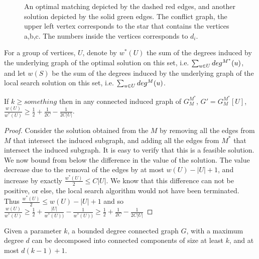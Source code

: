 \begin{figure}[h]
\centering
\subfloat[]{
\label{subfloat:graph}

}
\subfloat[]{
\label{subfloat:conflict}

}
\caption[]{
\label{fig:conflict}
An optimal matching depicted by the dashed red edges,
and another solution depicted by the solid green edges.  
The conflict graph, the upper left vertex corresponds 
to the star that contains the vertices a,b,c.
The numbers inside the vertices corresponds to $d_i$.   
}
\end{figure}  

For a group of vertices, $U$, denote by $w^*(U)$ the sum of the degrees 
induced by the underlying graph of the optimal solution on this set, i.e.
$\sum_{u \in U} \dinout[M^*](u)$, 
and let $w(S)$ be the sum of the degrees 
induced by the underlying graph of the local search solution on this set, i.e.
$\sum_{u \in U} \dinout(u)$.

\begin{lemma}
\label{lemma:r}
If $k \geq something$ then in any connected induced graph of $G^{M^*}_M$, 
$G'= G^{M^*}_M[U]$, 
$
\frac{w(U)}{w^*(U)} 
\geq \frac{1}{2} + \frac{1}{2C} - \frac{1}{2C|U|}
$.
\end{lemma}

\begin{proof}
Consider the solution obtained from the $M$ by removing all the edges from $M$
that intersect the induced subgraph, and adding all the edges from $M^*$ that
intersect the induced subgraph.
It is easy to verify that this is a feasible solution.
We now bound from below the difference in the value of the solution.
The value decrease due to the removal of the edges by at most $w(U) - |U| + 1$,
and increase by exactly $\frac{w^*(U)}{2} \leq C |U|$.
We know that this difference can not be positive, or else, the local search
algorithm would not have been terminated.
Thus 
$\frac{w^*(U)}{2} \leq w(U) - |U| + 1$ 
and so
$
\frac{w(U)}{w^*(U)} 
\geq 
\frac{1}{2} + \frac{|U|}{w^*(U))} - \frac{1}{w^*(U))}  
\geq
\frac{1}{2} + \frac{1}{2C} - \frac{1}{2C|U|}
$
\end{proof}


\begin{lemma}
\label{lemma:dec}
Given a parameter $k$, a bounded degree connected graph $G$, with a maximum
degree $d$ can be decomposed into connected components of size at least $k$, and at most
$d(k-1) + 1$.
\end{lemma}


